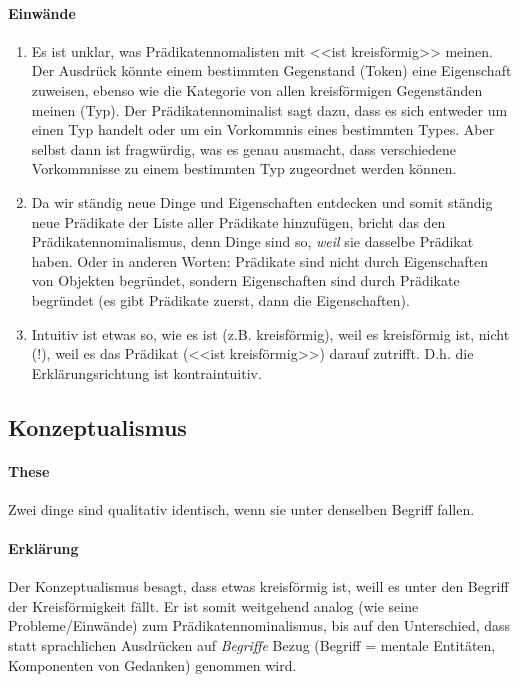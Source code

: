 \documentclass[../main.tex]{subfiles}
\begin{document}
\paragraph{Einwände}
\begin{enumerate}
	\item Es ist unklar, was Prädikatennomalisten mit <<ist kreisförmig>> meinen. Der Ausdrück könnte einem bestimmten Gegenstand (Token) eine Eigenschaft zuweisen, ebenso wie die Kategorie von allen kreisförmigen Gegenständen meinen (Typ). Der Prädikatennominalist sagt dazu, dass es sich entweder um einen Typ handelt oder um ein Vorkommnis eines bestimmten Types. Aber selbst dann ist fragwürdig, was es genau ausmacht, dass verschiedene Vorkommnisse zu einem bestimmten Typ zugeordnet werden können. 
	\item Da wir ständig neue Dinge und Eigenschaften entdecken und somit ständig neue Prädikate der Liste aller Prädikate hinzufügen, bricht das den Prädikatennominalismus, denn Dinge sind so, \textit{weil} sie dasselbe Prädikat haben. Oder in anderen Worten: Prädikate sind nicht durch Eigenschaften von Objekten begründet, sondern Eigenschaften sind durch Prädikate begründet (es gibt Prädikate zuerst, dann die Eigenschaften). 
	\item Intuitiv ist etwas so, wie es ist (z.B. kreisförmig), weil es kreisförmig ist, nicht (!), weil es das Prädikat (<<ist kreisförmig>>) darauf zutrifft. D.h. die Erklärungsrichtung ist kontraintuitiv. 
\end{enumerate}

\subsection{Konzeptualismus}
\paragraph{These} Zwei dinge sind qualitativ identisch, wenn sie unter denselben Begriff fallen.
\paragraph{Erklärung} Der Konzeptualismus besagt, dass etwas kreisförmig ist, weill es unter den Begriff der Kreisförmigkeit fällt. Er ist somit weitgehend analog (wie seine Probleme/Einwände) zum Prädikatennominalismus, bis auf den Unterschied, dass statt sprachlichen Ausdrücken auf \textit{Begriffe} Bezug (Begriff = mentale Entitäten, Komponenten von Gedanken) genommen wird.
\end{document}
